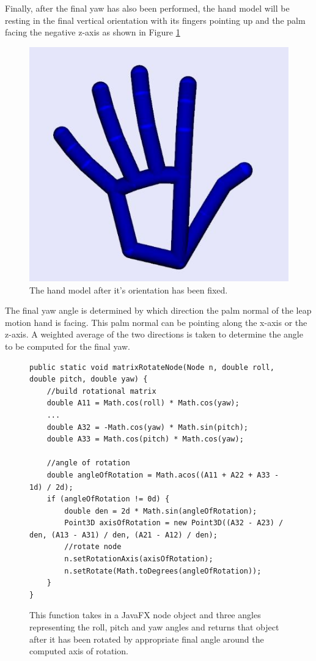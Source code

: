 Finally, after the final yaw has also been performed, the hand model will be resting in the final vertical orientation with its fingers pointing up and the palm facing the negative z-axis as shown in Figure \ref{fig:finalPos}
\begin{figure}[H]
\centering
\includegraphics[scale=0.45]{Figures/4_handFinalFix.JPG}
\caption[After Final Yaw]{The hand model after it's orientation has been fixed.}
\label{fig:finalPos}
\end{figure}
The final yaw angle is determined by which direction the palm normal of the leap motion hand is facing. This palm normal can be pointing along the x-axis or the z-axis. A weighted average of the two directions is taken to determine the angle to be computed for the final yaw. 

\begin{figure}[H]
\centering
\begin{lstlisting}
public static void matrixRotateNode(Node n, double roll, double pitch, double yaw) {
	//build rotational matrix
	double A11 = Math.cos(roll) * Math.cos(yaw);
	...
	double A32 = -Math.cos(yaw) * Math.sin(pitch);
	double A33 = Math.cos(pitch) * Math.cos(yaw);

	//angle of rotation
	double angleOfRotation = Math.acos((A11 + A22 + A33 - 1d) / 2d);
	if (angleOfRotation != 0d) {
		double den = 2d * Math.sin(angleOfRotation);
		Point3D axisOfRotation = new Point3D((A32 - A23) / den, (A13 - A31) / den, (A21 - A12) / den);
		//rotate node
		n.setRotationAxis(axisOfRotation);
		n.setRotate(Math.toDegrees(angleOfRotation));
	}
}
\end{lstlisting}
\caption[matrixRotateNode() Function]{This function takes in a JavaFX node object and three angles representing the roll, pitch and yaw angles and returns that object after it has been rotated by appropriate final angle around the computed axis of rotation.}
\label{fig:matrixRotateNode}
\end{figure}

